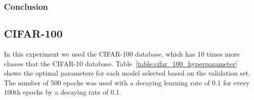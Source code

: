 \documentclass{WitsPhysicsReport}
\begin{document}


\subsubsection{Conclusion}

\newpage




\subsection{CIFAR-100}

In this experiment we used the CIFAR-100 database, which has 10 times more classes that the CIFAR-10 database. Table~\ref{table:cifar_100_hyperparameter} shows the optimal parameters for each model selected based on the validation set. The number of 500 epochs was used with a decaying learning rate of 0.1 for every 100th epochs by a decaying rate of 0.1.


\begin{table}[H]
    \centering
        \caption{CIFAR-100 dataset optimal parameters for the CESN, CRNN, CLSTM, CGRU and 3DCNN}
    \label{table:cifar_100_hyperparameter}
\end{table}
\end{document}
